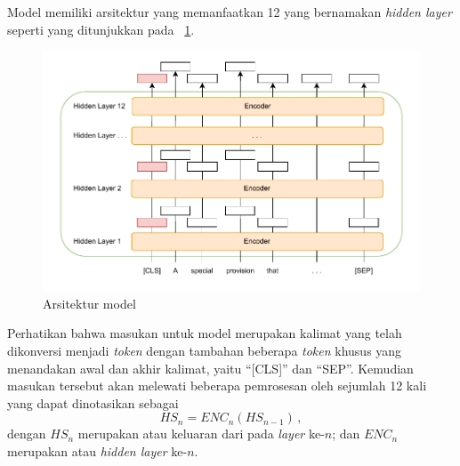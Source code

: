 Model \bert{} memiliki arsitektur yang memanfaatkan 12 \encoder{} yang bernamakan \textit{hidden layer} seperti yang ditunjukkan pada \gambar{}~\ref{fig:ilustrasi bert}.
\begin{figure}[!ht]
    \centering
    \includegraphics[scale=0.75]{assets/pdfs/IlustrasiBERT.drawio.pdf}
    \caption{Arsitektur model \bert{}}
    \label{fig:ilustrasi bert}
\end{figure}
Perhatikan bahwa masukan untuk model \bert{} merupakan kalimat yang telah dikonversi menjadi \textit{token} dengan tambahan beberapa \textit{token} khusus yang menandakan awal dan akhir kalimat, yaitu ``[CLS]'' dan ``SEP''. Kemudian masukan tersebut akan melewati beberapa pemrosesan oleh \encoder{} sejumlah 12 kali yang dapat dinotasikan sebagai
\[
HS_{n}=ENC_{n}(HS_{n-1}) \, ,
\]
dengan $HS_{n}$ merupakan \hs{} atau keluaran dari \encoder{} pada \textit{layer} ke-$n$; dan $ENC_{n}$ merupakan \encoder{} atau \textit{hidden layer} ke-$n$.


